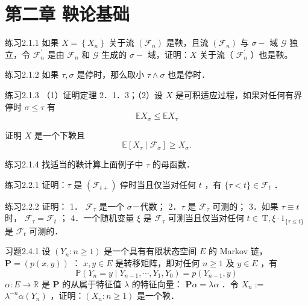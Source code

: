 \section{第二章 \quad 鞅论基础}
\begin{namedthm}{练习2.1.1}
如果 $X=\left\{X_{n}\right\}$ 关于流 $\left(\mathscr{F}_{n}\right)$ 是鞅，且流 $\left(\mathscr{F}_{n}\right)$ 与 $\sigma-$ 域 $\mathscr{G}$ 独立，令 $\mathscr{F}_{n}^{\prime}$ 是由 $\mathscr{F}_{n}$ 和 $\mathscr{G}$ 生成的 $\sigma-$ 域，证明：$X$ 关于流（ $\mathscr{F}_{n}^{\prime}$ ）也是鞅。
\end{namedthm}

\begin{namedthm}{练习2.1.2}
    如果 $\tau, \sigma$ 是停时，那么取小 $\tau \wedge \sigma$ 也是停时．
\end{namedthm}

\begin{namedthm}{练习2.1.3}
    （1）证明定理 2．1．3；（2）设 $X$ 是可积适应过程，如果对任何有界停时 $\sigma \leq \tau$ 有
$$
\mathbb{E} X_{\sigma} \leq \mathbb{E} X_{\tau}
$$

证明 $X$ 是一个下鞅且
$$
\mathbb{E}\left[X_{\tau} \mid \mathscr{F}_{\sigma}\right] \geq X_{\sigma} .
$$
\end{namedthm}

\begin{namedthm}{练习2.1.4}
    找适当的鞅计算上面例子中 $\tau$ 的母函数．
\end{namedthm}

\begin{namedthm}{练习2.2.1}
    证明：$\tau$ 是 $\left(\mathscr{F}_{t+}\right)$ 停时当且仅当对任何 $t$ ，有 $\{\tau<t\} \in \mathscr{F}_{t}$ ．
\end{namedthm}

\begin{namedthm}{练习2.2.2}
    证明：
1． $\mathscr{F}_{\tau}$ 是一个 $\sigma$－代数；
2．$\tau$ 是 $\mathscr{F}_{\tau}$ 可测的；
3．如果 $\tau \equiv t$ 时， $\mathscr{F}_{\tau}=\mathscr{F}_{t}$ ；
4．一个随机变量 $\xi$ 是 $\mathscr{F}_{\tau}$ 可测当且仅当对任何 $t \in \mathrm{~T}, \xi \cdot 1_{\{\tau \leq t\}}$ 是 $\mathscr{F}_{t}$ 可测的．
\end{namedthm}

\begin{namedthm}{习题2.4.1}
    设 $\left(Y_{n}: n \geq 1\right)$ 是一个具有有限状态空间 $E$ 的 Markov 链， $\mathbf{P}=(p(x, y))$ ： $x, y \in E$ 是转移矩阵，即对任何 $n \geq 1$ 及 $y \in E$ ，有
$$
\mathbb{P}\left(Y_{n}=y \mid Y_{n-1}, \cdots, Y_{1}, Y_{0}\right)=p\left(Y_{n-1}, y\right)
$$
$\alpha: E \rightarrow \mathbb{R}$ 是 $\mathbf{P}$ 的从属于特征值 $\lambda$ 的特征向量： $\mathbf{P} \alpha=\lambda \alpha$ ．令 $X_{n}:=$ $\lambda^{-n} \alpha\left(Y_{n}\right)$ ，证明：$\left(X_{n}: n \geq 1\right)$ 是一个鞅．
\end{namedthm}

